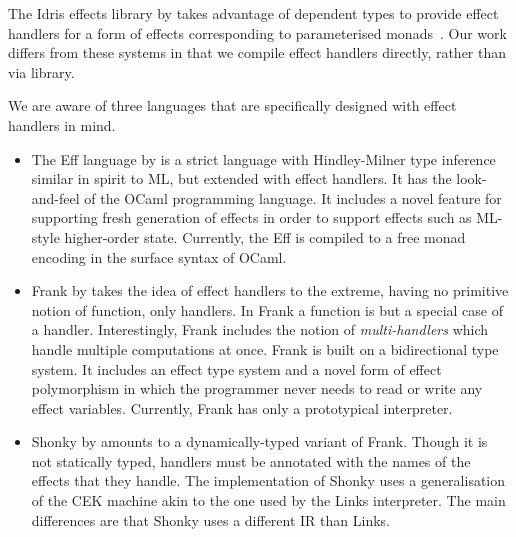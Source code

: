\documentclass[12pt,mscres,cdtppar,twoside,openright,logo,rightchapter,normalheadings]{infthesis}
\theoremstyle{definition}
\begin{document}
The Idris effects library by \cite{Brady2013} takes advantage of
dependent types to provide effect handlers for a form of effects
corresponding to parameterised monads~\citep{Atkey09}.
%
Our work differs from these systems in that we compile effect handlers
directly, rather than via library.

We are aware of three languages that are specifically designed with
effect handlers in mind.
%
\begin{itemize}
\item The Eff language by \cite{Bauer2015} is a strict language with
  Hindley-Milner type inference similar in spirit to ML, but extended
  with effect handlers. It has the look-and-feel of the OCaml
  programming language.
%
  It includes a novel feature for supporting fresh generation of
  effects in order to support effects such as ML-style higher-order
  state. Currently, the Eff is compiled to a free monad encoding in
  the surface syntax of OCaml.
%

\item Frank by \cite{Lindley2016} takes the idea of effect handlers to
  the extreme, having no primitive notion of function, only
  handlers. In Frank a function is but a special case of a
  handler. Interestingly, Frank includes the notion of
  \emph{multi-handlers} which handle multiple computations at
  once. Frank is built on a bidirectional type system. It includes an
  effect type system and a novel form of effect polymorphism in which
  the programmer never needs to read or write any effect
  variables. Currently, Frank has only a prototypical interpreter.

\item Shonky by \cite{McBride2016} amounts to a dynamically-typed
  variant of Frank. Though it is not statically typed, handlers must
  be annotated with the names of the effects that they handle. The
  implementation of Shonky uses a generalisation of the CEK machine
  akin to the one used by the Links interpreter. The main differences
  are that Shonky uses a different IR than Links. 
\end{itemize}
\end{document}
